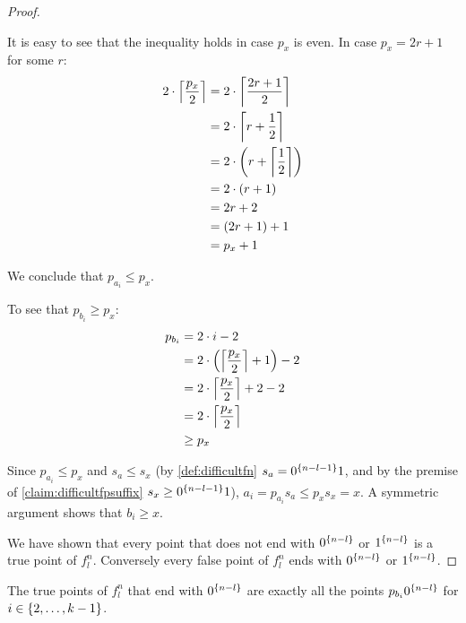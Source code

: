 \begin{proof}
\begin{itemize}
It is easy to see that
the inequality  holds
in case $p_x$ is even.
In case $p_x = 2r + 1$ for some $r$:
\begin{align*}
2 \cdot \ceil*{\frac{p_x}{2}}
&= 2 \cdot \ceil*{\frac{2r + 1}{2}} \\
&= 2 \cdot \ceil*{r + \frac{1}{2}} \\
&= 2 \cdot \round*{r + \ceil*{\frac{1}{2}}} \\
&= 2 \cdot (r + 1) \\
&= 2r + 2 \\
&= (2r + 1) + 1 \\
&= p_x + 1
\end{align*}

We conclude that $p_{a_i} \leq p_x$.

To see that $p_{b_i} \geq p_x$:
\begin{align*}
p_{b_i}
&= 2 \cdot i - 2 \\
&= 2 \cdot \round*{\ceil*{\frac{p_x}{2}} + 1} - 2 \\
&= 2 \cdot \ceil*{\frac{p_x}{2}} + 2 - 2 \\
&= 2 \cdot \ceil*{\frac{p_x}{2}} \\
&\geq p_x
\end{align*}

Since $p_{a_i} \leq p_x$ and $s_a \leq s_x$
(by \cref{def:difficultfn}
$s_a = \rep{0}{n-l-1} 1$,
and by the premise of \cref{claim:difficultfpsuffix}
$s_x \geq \rep{0}{n-l-1} 1$),
$a_i = p_{a_i} s_a \leq p_x s_x = x$.
A symmetric argument shows that $b_i \geq x$.
\end{itemize}

We have shown that every point that does not end with
$\rep{0}{n-l}$ or $\rep{1}{n-l}$
is a true point of $f_l^n$.
Conversely
every false point of $f_l^n$
ends with $\rep{0}{n-l}$ or $\rep{1}{n-l}$.
\end{proof}

\begin{observation}
\label{observation:difficulttpinb}
The true points of $f_l^n$
that end with $\rep{0}{n-l}$
are exactly all the points $p_{b_i} \rep{0}{n-l}$
for $i \in \curly{2, \ldots, k-1}$.
\end{observation}


